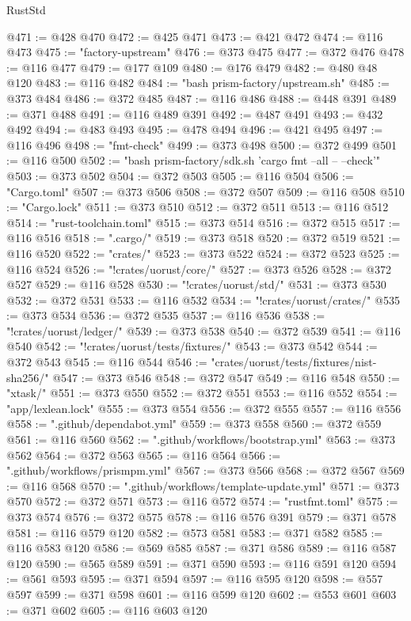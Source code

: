 \begin{lexlean}{RustStd}
\begin{coremodule}
@471 := @428 @470
@472 := @425 @471
@473 := @421 @472
@474 := @116 @473
@475 := "factory-upstream"
@476 := @373 @475
@477 := @372 @476
@478 := @116 @477
@479 := @177 @109
@480 := @176 @479
@482 := @480 @48 @120
@483 := @116 @482
@484 := "bash prism-factory/upstream.sh"
@485 := @373 @484
@486 := @372 @485
@487 := @116 @486
@488 := @448 @391
@489 := @371 @488
@491 := @116 @489 @391
@492 := @487 @491
@493 := @432 @492
@494 := @483 @493
@495 := @478 @494
@496 := @421 @495
@497 := @116 @496
@498 := "fmt-check"
@499 := @373 @498
@500 := @372 @499
@501 := @116 @500
@502 := "bash prism-factory/sdk.sh 'cargo fmt --all -- --check'"
@503 := @373 @502
@504 := @372 @503
@505 := @116 @504
@506 := "Cargo.toml"
@507 := @373 @506
@508 := @372 @507
@509 := @116 @508
@510 := "Cargo.lock"
@511 := @373 @510
@512 := @372 @511
@513 := @116 @512
@514 := "rust-toolchain.toml"
@515 := @373 @514
@516 := @372 @515
@517 := @116 @516
@518 := ".cargo/"
@519 := @373 @518
@520 := @372 @519
@521 := @116 @520
@522 := "crates/"
@523 := @373 @522
@524 := @372 @523
@525 := @116 @524
@526 := "!crates/uorust/core/"
@527 := @373 @526
@528 := @372 @527
@529 := @116 @528
@530 := "!crates/uorust/std/"
@531 := @373 @530
@532 := @372 @531
@533 := @116 @532
@534 := "!crates/uorust/crates/"
@535 := @373 @534
@536 := @372 @535
@537 := @116 @536
@538 := "!crates/uorust/ledger/"
@539 := @373 @538
@540 := @372 @539
@541 := @116 @540
@542 := "!crates/uorust/tests/fixtures/"
@543 := @373 @542
@544 := @372 @543
@545 := @116 @544
@546 := "crates/uorust/tests/fixtures/nist-sha256/"
@547 := @373 @546
@548 := @372 @547
@549 := @116 @548
@550 := "xtask/"
@551 := @373 @550
@552 := @372 @551
@553 := @116 @552
@554 := "app/lexlean.lock"
@555 := @373 @554
@556 := @372 @555
@557 := @116 @556
@558 := ".github/dependabot.yml"
@559 := @373 @558
@560 := @372 @559
@561 := @116 @560
@562 := ".github/workflows/bootstrap.yml"
@563 := @373 @562
@564 := @372 @563
@565 := @116 @564
@566 := ".github/workflows/prismpm.yml"
@567 := @373 @566
@568 := @372 @567
@569 := @116 @568
@570 := ".github/workflows/template-update.yml"
@571 := @373 @570
@572 := @372 @571
@573 := @116 @572
@574 := "rustfmt.toml"
@575 := @373 @574
@576 := @372 @575
@578 := @116 @576 @391
@579 := @371 @578
@581 := @116 @579 @120
@582 := @573 @581
@583 := @371 @582
@585 := @116 @583 @120
@586 := @569 @585
@587 := @371 @586
@589 := @116 @587 @120
@590 := @565 @589
@591 := @371 @590
@593 := @116 @591 @120
@594 := @561 @593
@595 := @371 @594
@597 := @116 @595 @120
@598 := @557 @597
@599 := @371 @598
@601 := @116 @599 @120
@602 := @553 @601
@603 := @371 @602
@605 := @116 @603 @120

\end{coremodule}
\end{lexlean}
